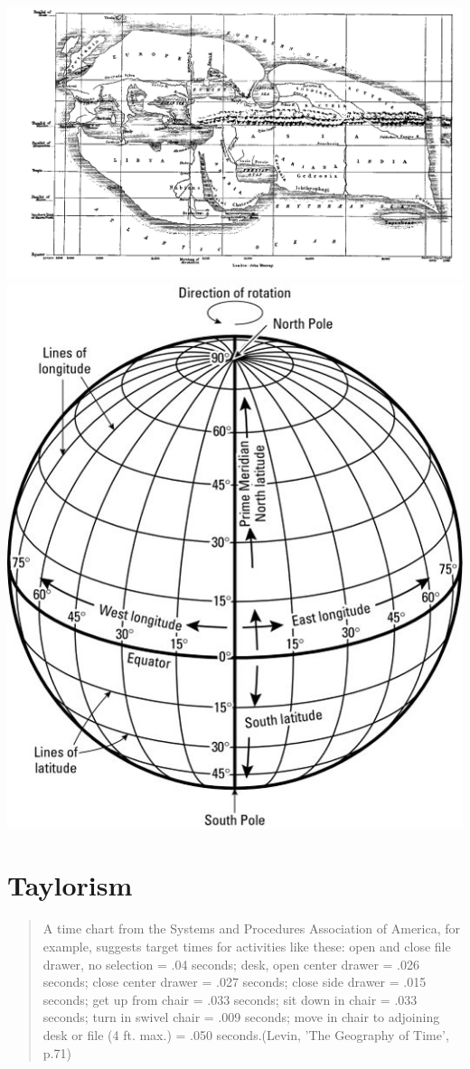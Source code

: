 \documentclass[11pt]{article}
\begin{document}
\newpage
\includegraphics{map.png}
\newpage
\includegraphics{long.jpg}


\newpage

\section*{Taylorism}

\begin{quote}
 A time chart from the Systems and Procedures
Association of America, for example, suggests target times for activities
like these: open and close file drawer, no selection = .04
seconds; desk, open center drawer = .026 seconds; close center
drawer = .027 seconds; close side drawer = .015 seconds; get up
from chair = .033 seconds; sit down in chair = .033 seconds; turn
in swivel chair = .009 seconds; move in chair to adjoining desk or
file (4 ft. max.) = .050 seconds.(Levin, 'The Geography of Time', p.71)
\end{quote}
\end{document}
